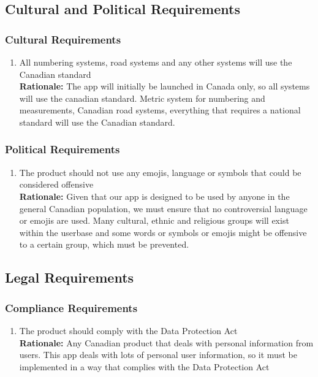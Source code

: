 \documentclass[]{article}
\begin{document}

\subsection{Cultural and Political Requirements}
\label{sub:cultural_and_political_requirements}

\subsubsection{Cultural Requirements}
\label{ssub:cultural_requirements}
\begin{enumerate}[{CP-C}1. ]
	\item All numbering systems, road systems and any other systems will use the Canadian standard \\
	{\bf Rationale:} The app will initially be launched in Canada only, so all systems will use the canadian standard. Metric system for numbering and measurements, Canadian road systems, everything that requires a national standard will use the Canadian standard.
\end{enumerate}

\subsubsection{Political Requirements}
\label{ssub:political_requirements}
\begin{enumerate}[{CP-P}1. ]
	\item The product should not use any emojis, language or symbols that could be considered offensive \\
	{\bf Rationale:} Given that our app is designed to be used by anyone in the general Canadian population, we must ensure that no controversial language or emojis are used. Many cultural, ethnic and religious groups will exist within the userbase and some words or symbols or emojis might be offensive to a certain group, which must be prevented.
\end{enumerate}


\subsection{Legal Requirements}
\label{sub:legal_requirements}

\subsubsection{Compliance Requirements}
\label{ssub:compliance_requirements}
\begin{enumerate}[{LR-COMP}1. ]
	\item The product should comply with the Data Protection Act \\
	{\bf Rationale:} Any Canadian product that deals with personal information from users. This app deals with lots of personal user information, so it must be implemented in a way that complies with the Data Protection Act
\end{enumerate}
\end{document}

